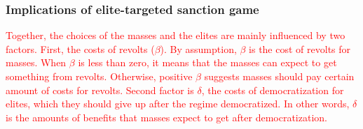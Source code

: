 \documentclass[11pt, letterpage]{article}
\begin{document}
	
\subsubsection*{Implications of elite-targeted sanction game}




\textcolor{red}{Together, the choices of the masses and the elites are mainly influenced by two factors. First, the costs of revolts ($\beta$). By assumption, $\beta$ is the cost of revolts for masses. When $\beta$ is less than zero, it means that the masses can expect to get something from revolts. Otherwise, positive $\beta$ suggests masses should pay certain amount of costs for revolts. Second factor is $\delta$, the costs of democratization for elites, which they should give up after the regime democratized. In other words, $\delta$ is the amounts of benefits that masses expect to get after democratization.}
\end{document}
